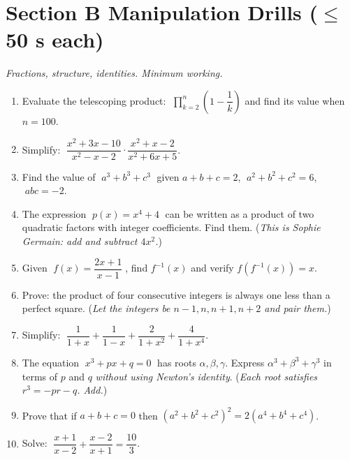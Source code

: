 \documentclass[11pt,a4paper]{article}
\begin{document}
\section*{Section B \quad Manipulation Drills \hfill{\normalfont\small($\leq$50 s each)}}

\noindent\textit{Fractions, structure, identities. Minimum working.}

\begin{enumerate}

\item Evaluate the telescoping product:
      $\;\displaystyle\prod_{k=2}^{n} \!\left(1 - \dfrac{1}{k}\right)$
      and find its value when $n = 100$.

\item Simplify: $\;\dfrac{x^2 + 3x - 10}{x^2 - x - 2} \cdot \dfrac{x^2 + x - 2}{x^2 + 6x + 5}$.

\item Find the value of $\;a^3 + b^3 + c^3\;$ given
      $a + b + c = 2$, $\;a^2+b^2+c^2 = 6$, $\;abc = -2$.

\item The expression $\;p(x) = x^4 + 4\;$ can be written as a product of two
      quadratic factors with integer coefficients. Find them.
      (\textit{This is Sophie Germain: add and subtract $4x^2$.})

\item Given $\;f(x) = \dfrac{2x+1}{x-1}\;$, find $f^{-1}(x)$ and verify
      $f(f^{-1}(x)) = x$.

\item Prove: the product of four consecutive integers is always one less
      than a perfect square.
      (\textit{Let the integers be $n-1, n, n+1, n+2$ and pair them.})

\item Simplify: $\;\dfrac{1}{1 + x} + \dfrac{1}{1 - x} + \dfrac{2}{1 + x^2} + \dfrac{4}{1 + x^4}$.

\item The equation $\;x^3 + px + q = 0\;$ has roots $\alpha, \beta, \gamma$.
      Express $\alpha^3 + \beta^3 + \gamma^3$ in terms of $p$ and $q$ \emph{without using Newton's identity}.
      (\textit{Each root satisfies $r^3 = -pr - q$. Add.})

\item Prove that if $a + b + c = 0$ then $(a^2+b^2+c^2)^2 = 2(a^4+b^4+c^4)$.

\item Solve: $\;\dfrac{x+1}{x-2} + \dfrac{x-2}{x+1} = \dfrac{10}{3}$.

\end{enumerate}
\end{document}
